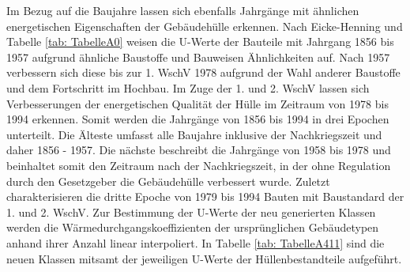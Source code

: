 Im Bezug auf die Baujahre lassen sich ebenfalls Jahrgänge mit ähnlichen energetischen Eigenschaften der Gebäudehülle erkennen.
Nach Eicke-Henning \cite{EickeHenning.2011} und Tabelle \ref{tab: TabelleA0} weisen die U-Werte der Bauteile mit Jahrgang 1856 bis 1957 aufgrund ähnliche Baustoffe und Bauweisen Ähnlichkeiten auf.
Nach 1957 verbessern sich diese bis zur 1. WschV 1978 aufgrund der Wahl anderer Baustoffe und dem Fortschritt im Hochbau.
Im Zuge der 1. und 2. WschV lassen sich Verbesserungen der energetischen Qualität der Hülle im Zeitraum von 1978 bis 1994 erkennen.
Somit werden die Jahrgänge von 1856 bis 1994 in drei Epochen unterteilt.
Die Älteste umfasst alle Baujahre inklusive der Nachkriegszeit und daher 1856 - 1957.
Die nächste beschreibt die Jahrgänge von 1958 bis 1978 und beinhaltet somit den Zeitraum nach der Nachkriegszeit, in der ohne Regulation durch den Gesetzgeber die Gebäudehülle verbessert wurde.
Zuletzt charakterisieren die dritte Epoche von 1979 bis 1994 Bauten mit Baustandard der 1. und 2. WschV.
Zur Bestimmung der U-Werte der neu generierten Klassen werden die Wärmedurchgangskoeffizienten der ursprünglichen Gebäudetypen anhand ihrer Anzahl linear interpoliert.
In Tabelle \ref{tab: TabelleA411} sind die neuen Klassen mitsamt der jeweiligen U-Werte der Hüllenbestandteile aufgeführt.

